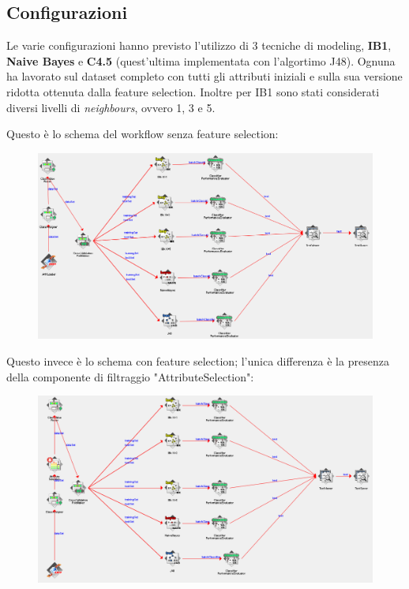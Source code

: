 \subsection{Configurazioni}

Le varie configurazioni hanno previsto l'utilizzo di 3 tecniche di modeling, \textbf{IB1}, \textbf{Naive Bayes} e \textbf{C4.5} (quest'ultima implementata con l'algortimo J48). Ognuna ha lavorato sul dataset completo con tutti gli attributi iniziali e sulla sua versione ridotta ottenuta dalla feature selection. Inoltre per IB1 sono stati considerati diversi livelli di \emph{neighbours}, ovvero 1, 3 e 5.

Questo è lo schema del workflow senza feature selection:

\begin{figure}[hbtp!]
	\hspace*{-1.1in}
	\includegraphics[width=1.4\textwidth]{./images/flow_no_featsel}
\end{figure}

Questo invece è lo schema con feature selection; l'unica differenza è la presenza della componente di filtraggio "AttributeSelection":

\begin{figure}[hbtp!]
	\hspace*{-1.1in}
	\includegraphics[width=1.4\textwidth]{./images/flow_featsel}
\end{figure}

